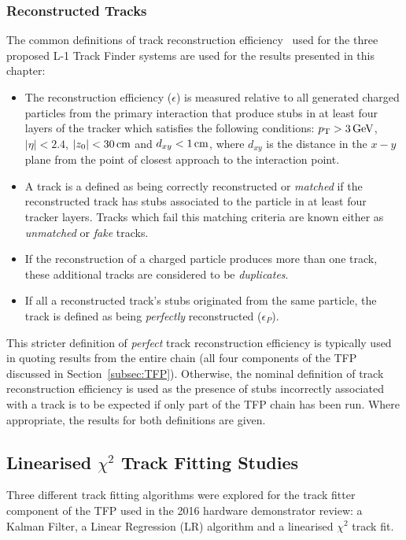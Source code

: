 \subsubsection{Reconstructed Tracks}\label{subsec:recoTracks}
The common definitions of track reconstruction efficiency~\cite{TMTT_JINST} used for the three proposed L-1 Track Finder systems are used for the results presented in this chapter:

\begin{itemize}
\item The reconstruction efficiency ($\epsilon$) is measured relative to all generated charged particles from the primary interaction that produce stubs in at least four layers of the tracker which satisfies the following conditions: $p_{\mathrm{T}} > 3\,\text{Ge\hspace{-.08em}V}$, $|\eta| < 2.4$, $|z_{0}| < 30\,\text{cm}$ and $d_{xy} < 1\,\text{cm}$, where $d_{xy}$ is the distance in the $x-y$ plane from the point of closest approach to the interaction point.
\item A track is a defined as being correctly reconstructed or \emph{matched} if the reconstructed track has stubs associated to the particle in at least four tracker layers. Tracks which fail this matching criteria are known either as \emph{unmatched} or \emph{fake} tracks.
\item If the reconstruction of a charged particle produces more than one track, these additional tracks are considered to be \emph{duplicates}.
\item If all a reconstructed track's stubs originated from the same particle, the track is defined as being \emph{perfectly} reconstructed ($\epsilon_{P}$). 
\end{itemize}

This stricter definition of \emph{perfect} track reconstruction efficiency is typically used in quoting results from the entire chain (\ie all four components of the TFP discussed in Section~\ref{subsec:TFP}).
Otherwise, the nominal definition of track reconstruction efficiency is used as the presence of stubs incorrectly associated with a track is to be expected if only part of the TFP chain has been run.
Where appropriate, the results for both definitions are given.


\subsection{Linearised $\chi^{2}$ Track Fitting Studies}\label{subsec:chi2}
Three different track fitting algorithms were explored for the track fitter component of the TFP used in the 2016 hardware demonstrator review: a Kalman Filter, a Linear Regression (LR) algorithm and a linearised $\chi^{2}$ track fit.

